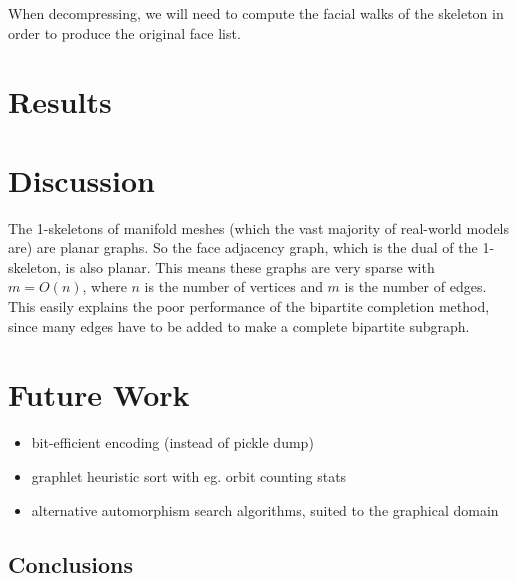 \documentclass{egpubl}
\begin{document}
When decompressing, we will need to compute the facial walks of the skeleton in order to produce the original face list.

\section{Results}


\section{Discussion}

The 1-skeletons of manifold meshes (which the vast majority of real-world models are) are planar graphs. So the face adjacency graph, which is the dual of the 1-skeleton, is also planar. This means these graphs are very sparse with $m = O(n)$, where $n$ is the number of vertices and $m$ is the number of edges. This easily explains the poor performance of the bipartite completion method, since many edges have to be added to make a complete bipartite subgraph.  


\section{Future Work}
\begin{itemize}
        \item bit-efficient encoding (instead of pickle dump)
        \item graphlet heuristic sort with eg. orbit counting stats
        \item alternative automorphism search algorithms, suited to the graphical domain
\end{itemize}

\subsection{Conclusions}



%



\end{document}
